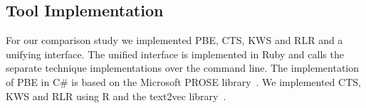 
\subsection{Tool Implementation}
For our comparison study we implemented PBE, CTS, KWS and RLR and a
unifying interface. The unified interface is implemented in Ruby and
calls the separate technique implementations over the command line.
The implementation of PBE in C\# is based on the Microsoft PROSE
library~\cite{prose2019webpage}. We implemented CTS, KWS and RLR using
R and the text2vec library~\cite{text2vec2019webpage}.

